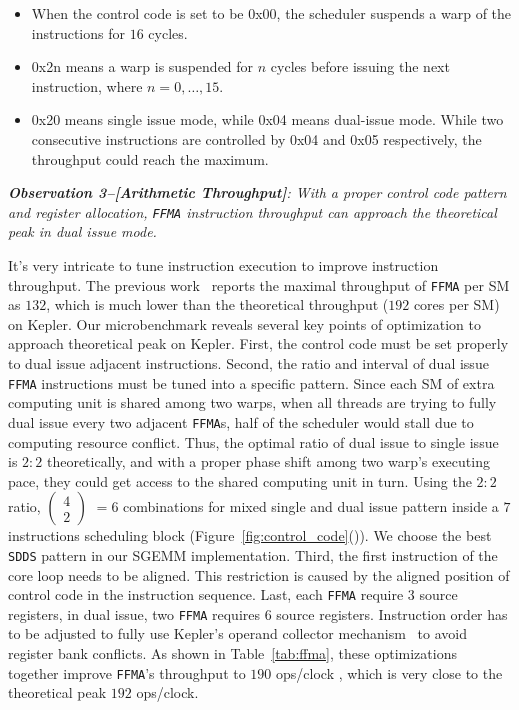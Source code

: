 \begin{itemize}
\item When the control code is set to be 0x00, the scheduler suspends a warp of the instructions for $16$ cycles.
\item 0x2n means a warp is suspended for $n$ cycles before issuing the next instruction, where $n=0, \dots, 15$.
\item 0x20 means single issue mode, while 0x04 means dual-issue mode.
While two consecutive instructions are controlled by 0x04 and 0x05 respectively, the throughput could reach the maximum.
\end{itemize}

{\em {\bf Observation 3--[Arithmetic Throughput]}:
With a proper control code pattern and register allocation, {\tt FFMA}
instruction throughput can approach the theoretical peak in dual issue mode.}

It's very intricate to tune instruction execution to improve instruction throughput. The previous work~\cite{lai}
reports the maximal throughput of {\tt FFMA} per SM as $132$, which is much lower than the theoretical throughput ($192$
cores per SM) on Kepler.
Our microbenchmark reveals several key points of optimization to approach theoretical peak on Kepler.
First, the control code must be set properly to dual issue adjacent instructions. Second, the ratio and interval of
dual issue {\tt FFMA} instructions must be tuned into a specific pattern.
Since each SM of extra computing unit is shared among two warps, when all threads are trying to fully dual issue every
two adjacent {\tt FFMA}s, half of the
scheduler would stall due to computing resource conflict.
Thus, the optimal ratio of dual issue to single issue is $2:2$ theoretically, and
with a proper phase shift among two warp's executing pace, they could get access to the shared computing unit in turn. %
Using the $2:2$ ratio, \( \begin{pmatrix} 4 \\ 2 \end{pmatrix} \) $=6$ combinations for mixed single  and dual issue pattern inside a $7$ instructions scheduling block (Figure~\ref{fig:control_code}()).
We choose the best {\tt SDDS} pattern in our SGEMM implementation.
Third, the first instruction of the core loop needs to be aligned. This restriction is
caused by the aligned position of control code in the instruction sequence.
Last, each {\tt FFMA} require $3$ source registers, in dual issue, two {\tt FFMA} requires $6$ source registers.  %
Instruction order has to be adjusted to fully use Kepler's operand collector mechanism~\cite{collector,tarjan2012policy}
to avoid register bank conflicts.
As shown in Table~\ref{tab:ffma}, these optimizations together improve {\tt FFMA}'s throughput to $190$ ops/clock
, which is very close to the theoretical peak $192$ ops/clock.

